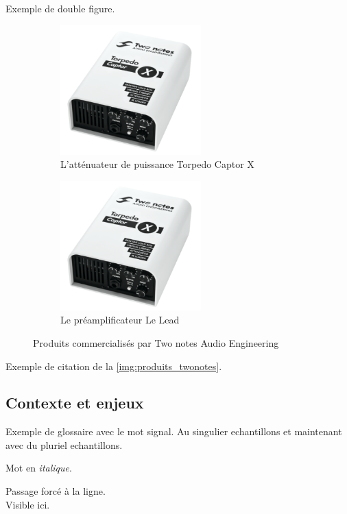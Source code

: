 \documentclass[a4paper]{article}
\begin{document}
Exemple de double figure.

\begin{figure}[H]
  \centering
  \begin{subfigure}{.49\textwidth}
    \centering
    \includegraphics[width=\linewidth, height=5cm, keepaspectratio]{../img/captorx}
     \caption{L'atténuateur de puissance Torpedo Captor X}
    \label{img:captorX}
  \end{subfigure}
  \begin{subfigure}{.49\textwidth}
    \centering
    \includegraphics[width=\linewidth, height=5cm, keepaspectratio]{../img/captorx}
     \caption{Le préamplificateur Le Lead}
    \label{img:leLead}
  \end{subfigure}
  \caption{Produits commercialisés par Two notes Audio Engineering}
  \label{img:produits_twonotes}
\end{figure}

Exemple de citation de la \autoref{img:produits_twonotes}.

\subsection{Contexte et enjeux}

Exemple de glossaire avec le mot \gls{signal}.
Au singulier \glspl{echantillon} et maintenant avec du pluriel \glspl{echantillon}.

Mot en \textit{italique}.

Passage forcé à la ligne.\\
Visible ici.
\end{document}
